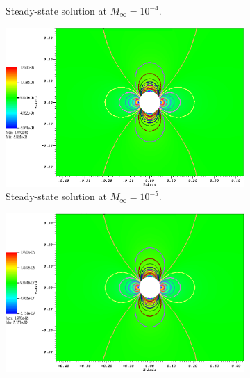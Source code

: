 \documentclass[preprint,10pt]{elsarticle}
\begin{document}
\begin{figure}[H]
\begin{subfigure}[b]{0.495\textwidth}
                \caption{Steady-state solution at $M_\infty=10^{-4}$.}
                \label{fig:cyl_1em4}
        \end{subfigure}    
        \begin{subfigure}[b]{0.495\textwidth}
                \centering
                \includegraphics[width=\textwidth]{CylinderMach1em5ZoomIn.png}
                \caption{Steady-state solution at $M_\infty=10^{-5}$.}
                \label{fig:cyl_1em5}
        \end{subfigure}
        \begin{subfigure}[b]{0.495\textwidth}
                \centering
                \includegraphics[width=\textwidth]{CylinderMach1em6ZoomIn.png}

\end{subfigure}
\end{figure}
\end{document}
